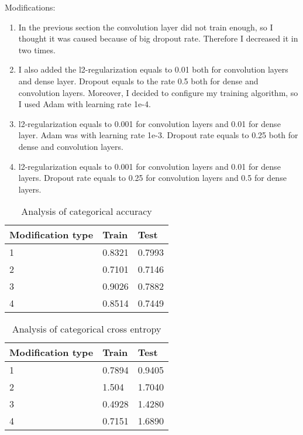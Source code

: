 Modifications:
\begin{enumerate}
	\item In the previous section the convolution layer did not train enough,
	 so I thought it was caused because of big dropout rate. Therefore I decreased it in two times.
	\item I also added the l2-regularization equals to 0.01 both for convolution layers and dense layer. 
	Dropout equals to the rate 0.5 both for dense and convolution layers. 
	Moreover, I decided to configure my training algorithm, so I used Adam with learning rate 1e-4. 
	\item l2-regularization equals to 0.001 for convolution layers and 0.01 for dense layer. 
	Adam was with learning rate 1e-3. 
	Dropout rate equals to 0.25 both for dense and convolution layers. 
	\item l2-regularization equals to 0.001 for convolution layers and 0.01 for dense layers. 
	Dropout rate equals to 0.25 for convolution layers and 0.5 for dense layers.
\end{enumerate}

\begin{table}[h]
	\centering
	\caption{Analysis of categorical accuracy}
	\label{my-label}
	\begin{tabular}{| p{3cm} | p{3cm} | p{3cm} |}
		\hline
		\textbf{Modification type}  & \textbf{Train} & \textbf{Test}                                                    
		\\ \hline
		1   &  0.8321 & 0.7993
		\\ \hline
		2   &  0.7101 & 0.7146 
		\\ \hline
		3   &  0.9026 & 0.7882
		\\ \hline		
		4   &  0.8514 & 0.7449
		\\ \hline
	\end{tabular}
\end{table}

\begin{table}[h]
	\centering
	\caption{Analysis of categorical cross entropy}
	\label{my-label}
	\begin{tabular}{| p{3cm} | p{3cm} | p{3cm} |}
		\hline
		\textbf{Modification type}  & \textbf{Train} & \textbf{Test}                                                    
		\\ \hline
		1   &  0.7894 & 0.9405
		\\ \hline
		2   &   1.504 &  1.7040
		\\ \hline
		3   &  0.4928 & 1.4280
		\\ \hline		
		4   &  0.7151 & 1.6890
		\\ \hline
	\end{tabular}
\end{table}

